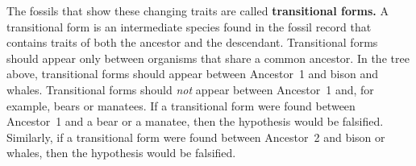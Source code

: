 \documentclass[12pt, hidelinks]{exam}
\begin{document}


The fossils that show these changing traits are called \textbf{transitional forms.} A transitional form is an intermediate species found in the fossil record that contains traits of both the ancestor and the descendant. Transitional forms should appear only between organisms that share a common ancestor.  In the tree above, transitional forms should appear between Ancestor~1 and bison and whales. Transitional forms should \textit{not} appear between Ancestor~1 and, for example, bears or manatees.  If a transitional form were found between Ancestor~1 and a bear or a manatee, then the hypothesis would be falsified. Similarly, if a transitional form were found between Ancestor~2 and bison or whales, then the hypothesis would be falsified.
\end{document}
